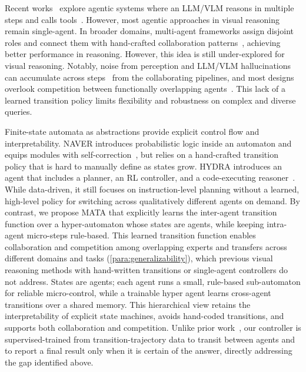 \documentclass{article} %
\newcommand{\revise}[1]{{#1}}
\newcommand{\methodname}{MATA}
\begin{document}
Recent works~\citep{you_idealgpt_2023, ke_hydra_2024, gao_clova_2024, zhong_viotgpt_2025} explore agentic systems where an LLM/VLM reasons in multiple steps and calls tools~\citep{ke_explain_2025}. However, most agentic approaches in visual reasoning remain single-agent. In broader domains, multi-agent frameworks assign disjoint roles and connect them with hand-crafted collaboration patterns~\citep{hong_metagpt_2023, li_agent-oriented_2024, nguyen_ma-rag_2025, zhang_agentorchestra_2025}, achieving better performance in reasoning. However, this idea is still under-explored for visual reasoning. Notably, noise from perception and LLM/VLM hallucinations can accumulate across steps~\citep{ke_dwim_2025} from the collaborating pipelines, and most designs overlook competition between functionally overlapping agents~\citep{wang_towards_2025}. This lack of a learned transition policy limits flexibility and robustness on complex and diverse queries.

Finite-state automata as abstractions provide explicit control flow and interpretability. NAVER introduces probabilistic logic inside an automaton and equips modules with self-correction~\citep{cai_naver_2025}, but relies on a hand-crafted transition policy that is hard to manually define as states grow. HYDRA introduces an agent that includes a planner, an RL controller, and a code-executing reasoner~\citep{ke_hydra_2024}. While data-driven, it still focuses on instruction-level planning without a learned, high-level policy for switching across qualitatively different agents on demand.
\revise{By contrast, we propose \methodname{} that explicitly learns the inter-agent transition function over a hyper-automaton whose states are agents, while keeping intra-agent micro-steps rule-based. This learned transition function enables collaboration and competition among overlapping experts and transfers across different domains and tasks (\autoref{para:generalizability}), which previous visual reasoning methods with hand-written transitions or single-agent controllers do not address.} States are agents; each agent runs a small, rule-based sub-automaton for reliable micro-control, while a trainable hyper agent learns cross-agent transitions over a shared memory. This hierarchical view retains the interpretability of explicit state machines, avoids hand-coded transitions, and supports both collaboration and competition. Unlike prior work~\citep{ke_hydra_2024, cai_naver_2025}, our controller is supervised-trained from transition-trajectory data to transit between agents and to report a final result only when it is certain of the answer, directly addressing the gap identified above.
\end{document}
